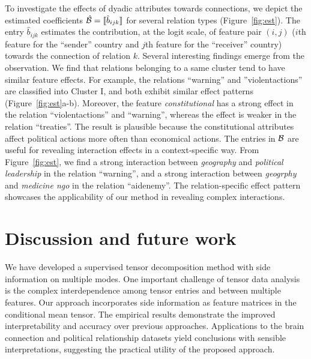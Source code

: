 \documentclass[12pt]{article}
\theoremstyle{definition}
\theoremstyle{definition}
\begin{document}
To investigate the effects of dyadic attributes towards connections, we depict the estimated coefficients $\hat {\mathcal{B}}=\llbracket \hat b_{ijk} \rrbracket$ for several relation types (Figure~\ref{fig:est}). {\color{blue}The entry $\hat b_{ijk}$ estimates the contribution, at the logit scale, of feature pair $(i,j)$ ($i$th feature for the ``sender'' country and $j$th feature for the ``receiver'' country) towards the connection of relation $k$.} Several interesting findings emerge from the observation. We find that relations belonging to a same cluster tend to have similar feature effects. For example, the relations ``warning'' and ''violentactions'' are classified into Cluster I, and both exhibit similar effect patterns (Figure~\ref{fig:est}a-b). Moreover, the feature \emph{constitutional} has a strong effect in the relation ``violentactions'' and ``warning'', whereas the effect is weaker in the relation ``treaties''. The result is plausible because the constitutional attributes affect political actions more often than economical actions. The entries in $\mathcal{B}$ are useful for revealing interaction effects in a context-specific way. 
From Figure~\ref{fig:est}, we find a strong interaction between \emph{geography} and \emph{political leadership} in the relation ``warning'', and a strong interaction between \emph{geogrphy} and \emph{medicine ngo} in the relation ``aidenemy''. The relation-specific effect pattern showcases the applicability of our method in revealing complex interactions. 

\vspace{-0.5cm}

\section{Discussion and future work}\label{sec:con}
We have developed a supervised tensor decomposition method with side information on multiple modes. One important challenge of tensor data analysis is the complex interdependence among tensor entries and between multiple features. Our approach incorporates side information as feature matrices in the conditional mean tensor. The empirical results demonstrate the improved interpretability and accuracy over previous approaches. Applications to the brain connection and political relationship datasets yield conclusions with sensible interpretations, suggesting the practical utility of the proposed approach.
 
\end{document}
